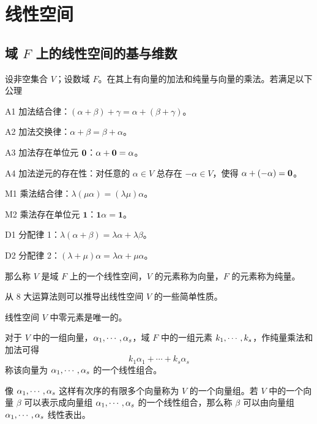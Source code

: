 \chapter{线性空间}

\section{\texorpdfstring{域 $F$ 上的线性空间的基与维数}{域 F 上的线性空间的基与维数}}

\begin{definition}[线性空间]
    设非空集合 $V$；设数域 $F$。在其上有向量的加法和纯量与向量的乘法。若满足以下公理

    A1 加法结合律：$(\alpha+\beta) + \gamma = \alpha +(\beta+\gamma)$。
    
    A2 加法交换律：$\alpha + \beta = \beta + \alpha$。
    
    A3 加法存在单位元 $\boldsymbol{0}$：$\alpha + \boldsymbol{0} = \alpha$。
    
    A4 加法逆元的存在性：对任意的 $\alpha \in V$ 总存在 $-\alpha\in V$，使得 $\alpha + (-\alpha) = \boldsymbol{0}$。
    
    M1 乘法结合律：$\lambda(\mu \alpha) = (\lambda \mu) \alpha$。
    
    M2 乘法存在单位元 $\boldsymbol{1}$：$\boldsymbol{1} \alpha = \boldsymbol{1}$。
    
    D1 分配律 1：$\lambda(\alpha+\beta) = \lambda \alpha + \lambda \beta$。
    
    D2 分配律 2：$(\lambda + \mu)\alpha = \lambda \alpha + \mu \alpha$。

    那么称 $V$ 是域 $F$ 上的一个线性空间，$V$ 的元素称为向量，$F$ 的元素称为纯量。
\end{definition}

从 $8$ 大运算法则可以推导出线性空间 $V$ 的一些简单性质。

\begin{theorem}
    线性空间 $V$ 中零元素是唯一的。
\end{theorem}

对于 $V$ 中的一组向量，$\alpha_1,\cdots,\alpha_s$，域 $F$ 中的一组元素 $k_1,\cdots,k_s$，作纯量乘法和加法可得
\[ k_1\alpha_1+\cdots+k_s\alpha_s \]
称该向量为 $\alpha_1,\cdots,\alpha_s$ 的一个线性组合。

像 $\alpha_1,\cdots,\alpha_s$ 这样有次序的有限多个向量称为 $V$ 的一个向量组。若 $V$ 中的一个向量 $\beta$ 可以表示成向量组 $\alpha_1,\cdots,\alpha_s$ 的一个线性组合，那么称 $\beta$ 可以由向量组 $\alpha_1,\cdots,\alpha_s$ 线性表出。

